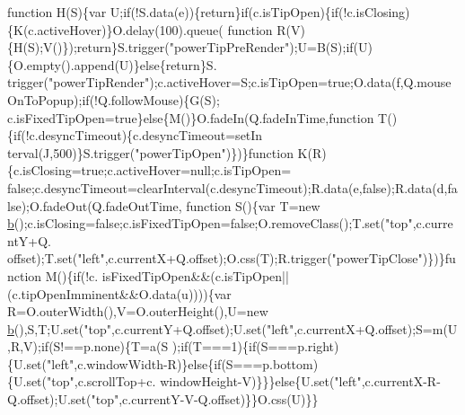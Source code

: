 \begin{DoxyCode}
{{      function} H(S)\{var U;\textcolor{keywordflow}{if}(!S.data(e))\{\textcolor{keywordflow}{return}\}\textcolor{keywordflow}{if}(c.isTipOpen)\{\textcolor{keywordflow}{if}(!c.isClosing)\{K(c.activeHover)\}O.delay(100).queue(\textcolor{keyword}{
      function} R(V)\{H(S);V()\});\textcolor{keywordflow}{return}\}S.trigger(\textcolor{stringliteral}{"powerTipPreRender"});U=B(S);\textcolor{keywordflow}{if}(U)\{O.empty().append(U)\}\textcolor{keywordflow}{else}\{\textcolor{keywordflow}{return}\}S.
      trigger(\textcolor{stringliteral}{"powerTipRender"});c.activeHover=S;c.isTipOpen=\textcolor{keyword}{true};O.data(f,Q.mouseOnToPopup);\textcolor{keywordflow}{if}(!Q.followMouse)\{G(S);
      c.isFixedTipOpen=\textcolor{keyword}{true}\}\textcolor{keywordflow}{else}\{M()\}O.fadeIn(Q.fadeInTime,\textcolor{keyword}{function} T()\{\textcolor{keywordflow}{if}(!c.desyncTimeout)\{c.desyncTimeout=setIn
      terval(J,500)\}S.trigger(\textcolor{stringliteral}{"powerTipOpen"})\})\}\textcolor{keyword}{function} K(R)\{c.isClosing=\textcolor{keyword}{true};c.activeHover=null;c.isTipOpen=\textcolor{keyword}{
      false};c.desyncTimeout=clearInterval(c.desyncTimeout);R.data(e,\textcolor{keyword}{false});R.data(d,\textcolor{keyword}{false});O.fadeOut(Q.fadeOutTime,\textcolor{keyword}{
      function} S()\{var T=\textcolor{keyword}{new} \hyperlink{jquery_8js_aa4026ad5544b958e54ce5e106fa1c805}{b}();c.isClosing=\textcolor{keyword}{false};c.isFixedTipOpen=\textcolor{keyword}{false};O.removeClass();T.set(\textcolor{stringliteral}{"top"},c.currentY+Q.
      offset);T.set(\textcolor{stringliteral}{"left"},c.currentX+Q.offset);O.css(T);R.trigger(\textcolor{stringliteral}{"powerTipClose"})\})\}\textcolor{keyword}{function} M()\{\textcolor{keywordflow}{if}(!c.
      isFixedTipOpen&&(c.isTipOpen||(c.tipOpenImminent&&O.data(u))))\{var R=O.outerWidth(),V=O.outerHeight(),U=\textcolor{keyword}{new} 
      \hyperlink{jquery_8js_aa4026ad5544b958e54ce5e106fa1c805}{b}(),S,T;U.set(\textcolor{stringliteral}{"top"},c.currentY+Q.offset);U.set(\textcolor{stringliteral}{"left"},c.currentX+Q.offset);S=m(U,R,V);\textcolor{keywordflow}{if}(S!==p.none)\{T=a(S
      );\textcolor{keywordflow}{if}(T===1)\{\textcolor{keywordflow}{if}(S===p.right)\{U.set(\textcolor{stringliteral}{"left"},c.windowWidth-R)\}\textcolor{keywordflow}{else}\{\textcolor{keywordflow}{if}(S===p.bottom)\{U.set(\textcolor{stringliteral}{"top"},c.scrollTop+c.
      windowHeight-V)\}\}\}\textcolor{keywordflow}{else}\{U.set(\textcolor{stringliteral}{"left"},c.currentX-R-Q.offset);U.set(\textcolor{stringliteral}{"top"},c.currentY-V-Q.offset)\}\}O.css(U)\}\}\textcolor{keyword}{
}}
\end{DoxyCode}
